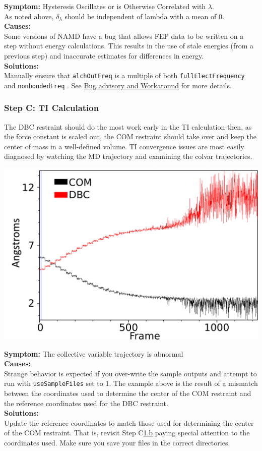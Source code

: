 \documentclass[9pt,tutorial]{Styling/livecoms}
\newcommand{\textInput}[1]{
  \texttt{#1}
}
\begin{document}
\noindent\textbf{Symptom:}  Hysteresis Oscillates or is Otherwise Correlated with $\lambda$.\\
As noted above, $\delta_\lambda$ should be independent of lambda with a mean of 0.\\
\textbf{Causes:}\\
Some versions of NAMD have a bug that allows FEP data to be written on a step without energy calculations. This results in the use of stale energies (from a previous step) and inaccurate estimates for differences in energy.\\
\textbf{Solutions:}\\
Manually ensure that \textInput{alchOutFreq} is a multiple of both \textInput{fullElectFrequency} and \textInput{nonbondedFreq}. See \href{https://www.ks.uiuc.edu/Research/namd/mailing_list/namd-l.2020-2021/1487.html}{Bug advisory and Workaround} for more details.\\


\subsubsection{Step C: TI Calculation}
The DBC restraint should do the most work early in the TI calculation then, as the force constant is scaled out, the COM restraint should take over and keep the center of mass in a well-defined volume. TI convergence issues are most easily diagnosed by watching the MD trajectory and examining the colvar trajectories.

\includegraphics[width=0.9\linewidth]{CV_COM_mismatchedRefs.png}

\noindent\textbf{Symptom:} The collective variable trajectory is abnormal\\
\textbf{Causes:}\\
Strange behavior is expected if you over-write the sample outputs and attempt to run with \textInput{useSampleFiles} set to 1. The example above is the result of a mismatch between the coordinates used to determine the center of the COM restraint and the reference coordinates used for the DBC restraint.\\
\textbf{Solutions:}\\
Update the reference coordinates to match those used for determining the center of the COM restraint. That is, revisit Step C\hyperref[step:defineGasRestraints]{1.b} paying special attention to the coordinates used. Make sure you save your files in the correct directories. \\
\end{document}
